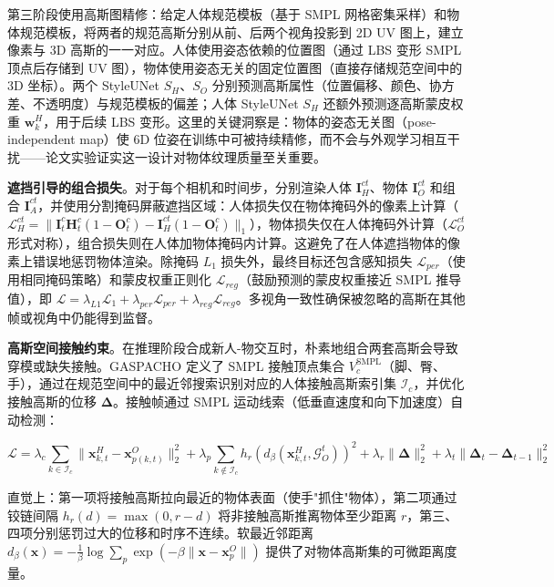 第三阶段使用高斯图精修：给定人体规范模板（基于 SMPL 网格密集采样）和物体规范模板，将两者的规范高斯分别从前、后两个视角投影到 2D UV 图上，建立像素与 3D 高斯的一一对应。人体使用姿态依赖的位置图（通过 LBS 变形 SMPL 顶点后存储到 UV 图），物体使用姿态无关的固定位置图（直接存储规范空间中的 3D 坐标）。两个 StyleUNet $S_H$、$S_O$ 分别预测高斯属性（位置偏移、颜色、协方差、不透明度）与规范模板的偏差；人体 StyleUNet $S_H$ 还额外预测逐高斯蒙皮权重 $\mathbf{w}_k^H$，用于后续 LBS 变形。这里的关键洞察是：物体的姿态无关图（pose-independent map）使 6D 位姿在训练中可被持续精修，而不会与外观学习相互干扰——论文实验证实这一设计对物体纹理质量至关重要。

\textbf{遮挡引导的组合损失}。对于每个相机和时间步，分别渲染人体 $\mathbf{I}_H^{ct}$、物体 $\mathbf{I}_O^{ct}$ 和组合 $\mathbf{I}_A^{ct}$，并使用分割掩码屏蔽遮挡区域：人体损失仅在物体掩码外的像素上计算（$\mathcal{L}_H^{ct} = \|\mathbf{I}_t^c \mathbf{H}_t^c (1 - \mathbf{O}_t^c) - \mathbf{I}_H^{ct} (1 - \mathbf{O}_t^c)\|_1$），物体损失仅在人体掩码外计算（$\mathcal{L}_O^{ct}$ 形式对称），组合损失则在人体加物体掩码内计算。这避免了在人体遮挡物体的像素上错误地惩罚物体渲染。除掩码 $L_1$ 损失外，最终目标还包含感知损失 $\mathcal{L}_{per}$（使用相同掩码策略）和蒙皮权重正则化 $\mathcal{L}_{reg}$（鼓励预测的蒙皮权重接近 SMPL 推导值），即 $\mathcal{L} = \lambda_{L1}\mathcal{L}_1 + \lambda_{per}\mathcal{L}_{per} + \lambda_{reg}\mathcal{L}_{reg}$。多视角一致性确保被忽略的高斯在其他帧或视角中仍能得到监督。

\textbf{高斯空间接触约束}。在推理阶段合成新人-物交互时，朴素地组合两套高斯会导致穿模或缺失接触。GASPACHO 定义了 SMPL 接触顶点集合 $V_c^{\text{SMPL}}$（脚、臀、手），通过在规范空间中的最近邻搜索识别对应的人体接触高斯索引集 $\mathcal{I}_c$，并优化接触高斯的位移 $\boldsymbol{\Delta}$。接触帧通过 SMPL 运动线索（低垂直速度和向下加速度）自动检测：

\begin{equation}
\mathcal{L} = \lambda_c \sum_{k \in \mathcal{I}_c} \|\mathbf{x}_{k,t}^H - \mathbf{x}_{p(k,t)}^O\|_2^2 + \lambda_p \sum_{k \notin \mathcal{I}_c} h_r(d_\beta(\mathbf{x}_{k,t}^H, \mathcal{G}_O^t))^2 + \lambda_r \|\boldsymbol{\Delta}\|_2^2 + \lambda_t \|\boldsymbol{\Delta}_t - \boldsymbol{\Delta}_{t-1}\|_2^2
\end{equation}

直觉上：第一项将接触高斯拉向最近的物体表面（使手"抓住"物体），第二项通过铰链间隔 $h_r(d) = \max(0, r - d)$ 将非接触高斯推离物体至少距离 $r$，第三、四项分别惩罚过大的位移和时序不连续。软最近邻距离 $d_\beta(\mathbf{x}) = -\frac{1}{\beta} \log \sum_{p} \exp(-\beta \|\mathbf{x} - \mathbf{x}_p^O\|)$ 提供了对物体高斯集的可微距离度量。


